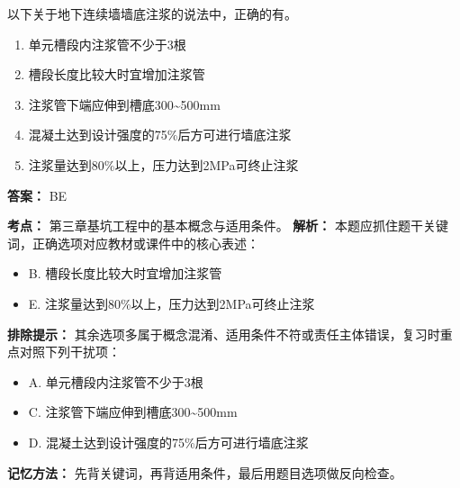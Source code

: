\documentclass[UTF8,fontset=fandol,11pt]{ctexart}
\begin{document}
\begin{quizbox}[title={第 7 题}]
以下关于地下连续墙墙底注浆的说法中，正确的有。\\
\begin{enumerate}[label=\Alph*.]
\item 单元槽段内注浆管不少于3根
\item 槽段长度比较大时宜增加注浆管
\item 注浆管下端应伸到槽底300\textasciitilde{}500mm
\item 混凝土达到设计强度的75\%后方可进行墙底注浆
\item 注浆量达到80\%以上，压力达到2MPa可终止注浆
\end{enumerate}
\textbf{答案：} BE
\vspace{0.25em}
\begin{answerbox}[title={考点解析}]
\textbf{考点：} 第三章基坑工程中的基本概念与适用条件。
\textbf{解析：} 本题应抓住题干关键词，正确选项对应教材或课件中的核心表述：
\begin{itemize}
\item B. 槽段长度比较大时宜增加注浆管
\item E. 注浆量达到80\%以上，压力达到2MPa可终止注浆
\end{itemize}
\textbf{排除提示：} 其余选项多属于概念混淆、适用条件不符或责任主体错误，复习时重点对照下列干扰项：
\begin{itemize}
\item A. 单元槽段内注浆管不少于3根
\item C. 注浆管下端应伸到槽底300\textasciitilde{}500mm
\item D. 混凝土达到设计强度的75\%后方可进行墙底注浆
\end{itemize}
\textbf{记忆方法：} 先背关键词，再背适用条件，最后用题目选项做反向检查。
\end{answerbox}
\end{quizbox}

\vspace{0.2em}
\end{document}
